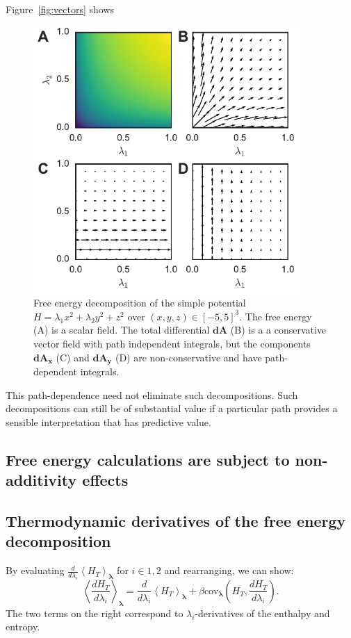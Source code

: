 \documentclass[%
 preprint,
 amsmath,amssymb,
 aps,
]{revtex4-1}
\renewcommand{\vec}[1]{{\bm{#1}}}
\begin{document}
Figure~\ref{fig:vectors} shows 

\begin{figure}
\centering
\includegraphics[width=4in]{GraphicalExample/vectors.pdf}
\caption{Free energy decomposition of the simple potential $H=\lambda_1 x^2 + \lambda_2 y^2 + z^2$ over $(x, y, z) \in [-5, 5]^3$. The free energy (A) is a scalar field. The total differential $\vec{dA}$ (B) is a a conservative vector field with path independent integrals, but the components $\vec{dA_x}$ (C) and $\vec{dA_y}$ (D) are non-conservative and have path-dependent integrals.}
\end{figure}

This path-dependence need not eliminate such decompositions. Such decompositions can still be of substantial value if a particular path provides a sensible interpretation that has predictive value.


\subsection{Free energy calculations are subject to non-additivity effects}

\subsection{Thermodynamic derivatives of the free energy decomposition}
\label{s:CumulantDerv}

By evaluating $\frac{d}{d\lambda_i}\left<H_T\right>_{\vec\lambda}$ for $i \in {1, 2}$ and rearranging, we can show:
\begin{equation}
\left<\frac{dH_T}{d\lambda_i}\right>_{\vec\lambda} = 
\frac{d}{d\lambda_i}\left<H_T\right>_{\vec\lambda} +
\beta \mathrm{cov}_{\vec\lambda}\left(H_T, \frac{dH_T}{d\lambda_i} \right).
\label{eq:deriv}
\end{equation}
The two terms on the right correspond to $\lambda_i$-derivatives of the enthalpy and entropy.
\end{document}
